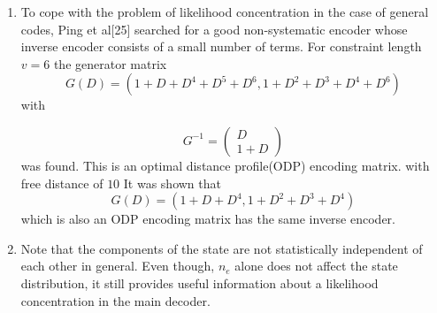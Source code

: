 \documentclass[fontsize=12pt]{article}
\theoremstyle{definition}
\begin{document}
\begin{enumerate}
\item To cope with the problem of likelihood concentration in the case of general codes, Ping et al[25] searched for a good non-systematic encoder whose inverse encoder consists of a small number of terms. For constraint length $v=6$ the generator matrix \begin{equation}
G(D)=\left(1+D+D^{4}+D^{5}+D^{6}, 1+D^{2}+D^{3}+D^{4}+D^{6}\right)
\end{equation} with 

\begin{equation}
G^{-1}= \left(\begin{array}{c}
D \\ 1 + D
\end{array}\right)
\end{equation}
was found. This is an optimal distance profile(ODP) encoding matrix. with free distance of $10$ It was shown that 
\begin{equation}
G(D)=\left(1+D+D^{4}, 1+D^{2}+D^{3}+D^{4}\right) 
\end{equation}
which is also an ODP encoding matrix has the same inverse encoder.

\item Note that the components of the state are not
statistically independent of each other in general.  Even though, $n_e$
alone does not affect the state distribution, it still
provides useful information about a likelihood concentration
in the main decoder.

\end{enumerate}
\end{document}
